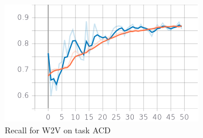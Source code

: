 \documentclass{article}
\begin{document}
\begin{figure}[!htb]
\begin{minipage}{0.48\textwidth}
                    \centering
                    \includegraphics[width=.7\linewidth]{w2v_acd_epoch_recall.png}
                    \caption{Recall for W2V on task ACD}\label{Fig:Data9}
                \end{minipage}
            \end{figure}
\end{document}
